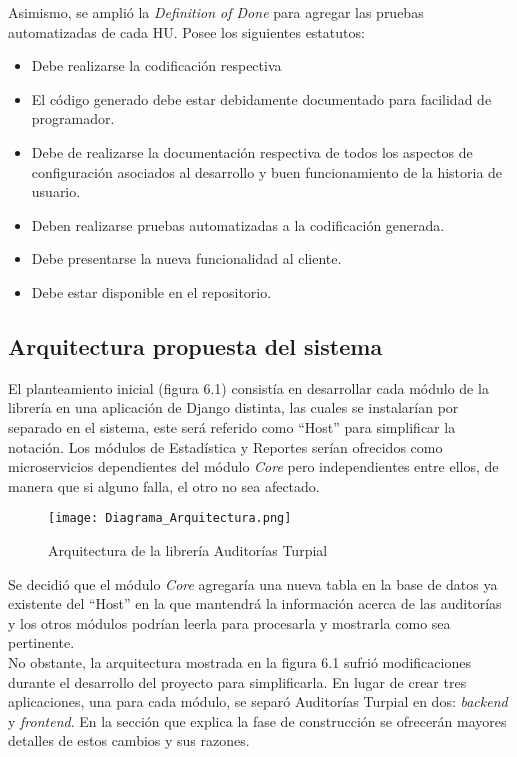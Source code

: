 Asimismo, se amplió la \textit{Definition of Done} para agregar las pruebas automatizadas de cada HU. Posee los siguientes estatutos:

\begin{itemize}
    \item Debe realizarse la codificación respectiva
    \item El código generado debe estar debidamente documentado para facilidad de programador.
    \item Debe de realizarse la documentación respectiva de todos los aspectos de configuración asociados al desarrollo y buen funcionamiento de la historia de usuario.
    \item Deben realizarse pruebas automatizadas a la codificación generada.
    \item Debe presentarse la nueva funcionalidad al cliente.
    \item Debe estar disponible en el repositorio.
\end{itemize}

\subsection{Arquitectura propuesta del sistema}

El planteamiento inicial (figura 6.1) consistía en desarrollar cada módulo de la librería en una aplicación de Django distinta, las cuales se instalarían por separado en el sistema, este será referido como “Host” para simplificar la notación. Los módulos de Estadística y Reportes serían ofrecidos como microservicios dependientes del módulo \textit{Core} pero independientes entre ellos, de manera que si alguno falla, el otro no sea afectado.\\

\begin{figure}[h]
\centering
\texttt{[image: Diagrama\_Arquitectura.png]}
\caption{Arquitectura de la librería Auditorías Turpial}
\label{fig:figure6.1}
\end{figure}

Se decidió que el módulo \textit{Core} agregaría una nueva tabla en la base de datos ya existente del “Host” en la que mantendrá la información acerca de las auditorías y los otros módulos podrían leerla para procesarla y mostrarla como sea  pertinente.\\

No obstante, la arquitectura mostrada en la figura 6.1 sufrió modificaciones durante el desarrollo del proyecto para simplificarla. En lugar de crear tres aplicaciones, una para cada módulo, se separó Auditorías Turpial en dos: \textit{backend} y \textit{frontend}. En la sección que explica la fase de construcción se ofrecerán mayores detalles de estos cambios y sus razones. \\

